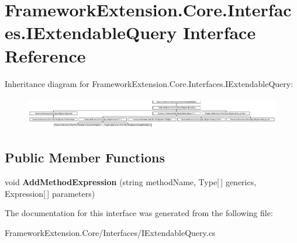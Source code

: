 \hypertarget{interface_framework_extension_1_1_core_1_1_interfaces_1_1_i_extendable_query}{\section{Framework\-Extension.\-Core.\-Interfaces.\-I\-Extendable\-Query Interface Reference}
\label{interface_framework_extension_1_1_core_1_1_interfaces_1_1_i_extendable_query}
}
Inheritance diagram for Framework\-Extension.\-Core.\-Interfaces.\-I\-Extendable\-Query\-:\begin{figure}[H]
\begin{center}
\leavevmode
\includegraphics[height=1.435897cm]{interface_framework_extension_1_1_core_1_1_interfaces_1_1_i_extendable_query}
\end{center}
\end{figure}
\subsection*{Public Member Functions}
\begin{DoxyCompactItemize}
\item 
\hypertarget{interface_framework_extension_1_1_core_1_1_interfaces_1_1_i_extendable_query_ad95cd62b9f8cc132afd44759f849b9a1}{void {\bfseries Add\-Method\-Expression} (string method\-Name, Type\mbox{[}$\,$\mbox{]} generics, Expression\mbox{[}$\,$\mbox{]} parameters)}\label{interface_framework_extension_1_1_core_1_1_interfaces_1_1_i_extendable_query_ad95cd62b9f8cc132afd44759f849b9a1}

\end{DoxyCompactItemize}


The documentation for this interface was generated from the following file\-:\begin{DoxyCompactItemize}
\item 
Framework\-Extension.\-Core/\-Interfaces/I\-Extendable\-Query.\-cs\end{DoxyCompactItemize}
